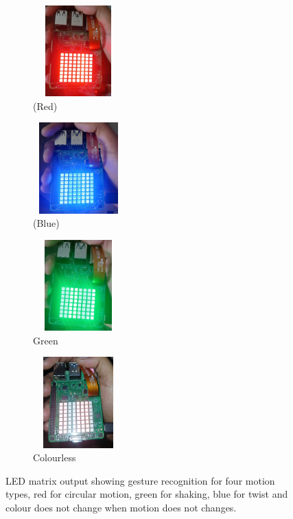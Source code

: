 \documentclass[a4paper,12pt]{article}
\begin{document}
\begin{figure}[h]
    \centering

    \begin{subfigure}[b]{0.23\textwidth}
        \centering
        \includegraphics[width=3.5cm,height=3.5cm,keepaspectratio]{Red.jpg}
        \caption{(Red)}
        \label{fig:red}
    \end{subfigure}
    \hfill
    \begin{subfigure}[b]{0.23\textwidth}
        \centering
        \includegraphics[width=3.5cm,height=3.5cm,keepaspectratio]{Blue.jpg}
        \caption{(Blue)}
        \label{fig:blue}
    \end{subfigure}
    \hfill
    \begin{subfigure}[b]{0.23\textwidth}
        \centering
        \includegraphics[width=3.5cm,height=3.5cm,keepaspectratio]{Green.jpg}
        \caption{Green}
        \label{fig:green}
    \end{subfigure}
    \hfill
    \begin{subfigure}[b]{0.23\textwidth}
        \centering
        \includegraphics[width=3.5cm,height=3.5cm,keepaspectratio]{Colourless.jpg}
        \caption{Colourless}
        \label{fig:yellow}
    \end{subfigure}

    \caption{LED matrix output showing gesture recognition for four motion types, red for circular motion, green for shaking, blue for twist and colour does not change when motion does not changes.}
    \label{fig:all_gestures}
\end{figure}
\end{document}
